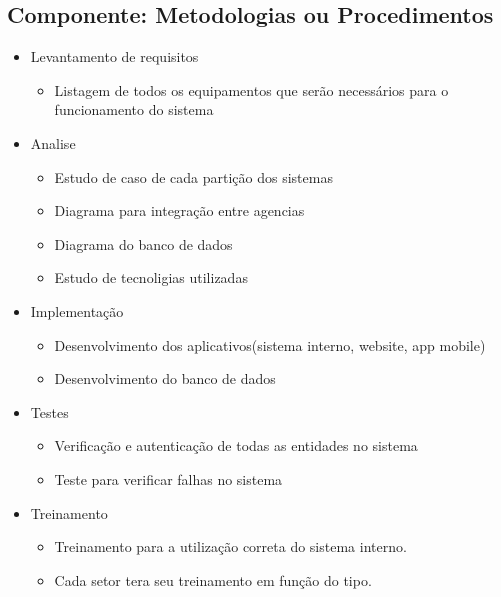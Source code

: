 \subsection{Componente: Metodologias ou Procedimentos}
\begin{itemize}
       \item Levantamento de requisitos
             \begin{itemize}
                    \item Listagem de todos os equipamentos que serão necessários para o funcionamento do
                          sistema
                          
             \end{itemize}
       \item Analise
             \begin{itemize}
                    \item Estudo de caso de cada partição dos sistemas
                    \item Diagrama para integração entre agencias
                    \item Diagrama do banco de dados
                    \item Estudo de tecnoligias utilizadas
             \end{itemize}
       \item Implementação
             \begin{itemize}
                    \item Desenvolvimento dos aplicativos(sistema interno, website, app mobile)
                    \item Desenvolvimento do banco de dados
             \end{itemize}
       \item Testes
             \begin{itemize}
                    \item Verificação e autenticação de todas as entidades no sistema
                    \item Teste para verificar falhas no sistema
             \end{itemize}
       \item Treinamento
             \begin{itemize}
                    \item Treinamento para a utilização correta do sistema interno.
                    \item Cada setor tera seu treinamento em função do tipo.
             \end{itemize}
\end{itemize}

